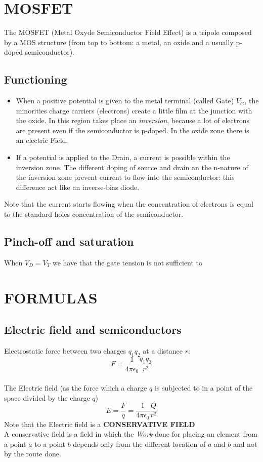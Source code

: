 \documentclass[12pt]{article}
\newcommand{\B}{\textbf}
\newcommand{\I}{\textit}
\newcommand{\bite}{\begin{itemize}} %
\newcommand{\fite}{\end{itemize}}   %
\begin{document}
\section{MOSFET}
The MOSFET (Metal Oxyde Semiconductor Field Effect) is a tripole composed by a MOS structure (from top to bottom: a metal, an oxide and a usually p-doped semiconductor).
\subsection{Functioning}
\bite
	\item When a positive potential is given to the metal terminal (called Gate) $V_G$, the minorities charge carriers (electrons) create a little film at the junction with the oxide. In this region takes place an \I{inversion}, because a lot of electrons are present even if the semiconductor is p-doped. In the oxide zone there is an electric Field.
	\item If a potential is applied to the Drain, a current is possible within the inversion zone. The different doping of source and drain an the n-nature of the inversion zone prevent current to flow into the semiconductor: this difference act like an inverse-bias diode. 
\fite
Note that the current starts flowing when the concentration of electrons is equal to the standard holes concentration of the semiconductor. 

\subsection{Pinch-off and saturation}
When $V_D = V_T$ we have that the gate tension is not sufficient to 


\section{FORMULAS}
\subsection{Electric field and semiconductors}

Electrostatic force between two charges $q_1 q_2$ at a distance $r$:  \begin{equation}
	F = \frac{1}{4\pi\epsilon_0}\frac{q_1q_2}{r^2}
\end{equation} \\ 
 The Electric field (as the force which a charge $q$ is subjected to in a point of the space divided by the charge $q$)
	\begin{equation}
		E = \frac{F}{q} = \frac{1}{4\pi\epsilon_0}\frac{Q}{r^2}
	\end{equation} Note that the Electric field is a \B{CONSERVATIVE FIELD}\\
	A conservative field is a field in which the \I{Work} done for placing an element from a point $a$ to a point $b$ depends only from the different location of $a$ and $b$ and not by the route done.\\
\end{document}
